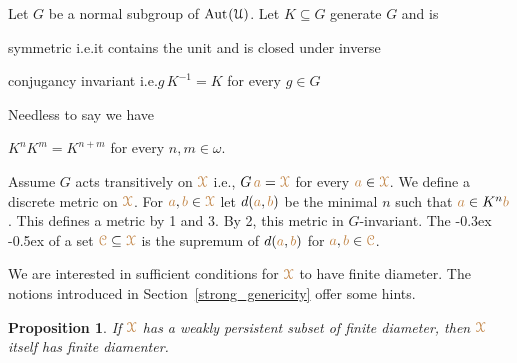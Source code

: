 \documentclass[10pt,openany]{amsproc}
\newcommand{\mylabel}[1]{{\ssf{#1}}\hfill}
\renewenvironment{itemize}
  {\begin{list}{}{%
   \setlength{\parskip}{0mm}
   \setlength{\topsep}{.2\baselineskip}
   \setlength{\rightmargin}{0mm}
   \setlength{\listparindent}{0mm}
   \setlength{\itemindent}{0mm}
   \setlength{\labelwidth}{2ex}
   \setlength{\itemsep}{.1\baselineskip}
   \setlength{\parsep}{0mm}
   \setlength{\partopsep}{0mm}
   \setlength{\labelsep}{1ex}
   \setlength{\leftmargin}{\labelwidth+\labelsep}
   \let\makelabel\mylabel
   }}
   {\vspace*{-.3\baselineskip}\end{list}}
\def\Aut{{\rm Aut\kern.15ex}}
\def\X{\EuScript X}
\def\C{\EuScript C}
\def\U{\EuScript U}
\def\ssf#1{\textsf{\small #1}}
\newcounter{thm}
\theoremstyle{mio}
\newtheorem{proposition}[thm]{Proposition}\tcolorboxenvironment{proposition}{mythm}
\def\mr{\color{brown}}
\def\mrC{{\mr\C}}
\def\mrX{{\mr\X}}
\renewcommand*{\emph}[1]{%
\kern-0.3ex
\smash{\tikz[baseline]\node[rectangle, fill=black!20!yellow!50!white, rounded corners, inner xsep=0.5ex, inner ysep=0.2ex, anchor=base, minimum height = 2.7ex]{#1};}\kern-0.5ex
}
\begin{document}
Let $G$ be a normal subgroup of $\Aut(\U)$.
Let $K\subseteq G$ generate $G$ and is
\begin{itemize}
  \item[1.] symmetric i.e.\@ it contains the unit and is closed under inverse
  \item[2.] conjugancy invariant i.e.\@ $g\,K^{-1}=K$ for every $g\in G$
\end{itemize}

Needless to say we have 

\begin{itemize}
  \item[3.] $K^nK^m=K^{n+m}$ for every $n,m\in\omega$.
\end{itemize}

Assume $G$ acts transitively on $\mrX$ i.e., $G\,{\mr a}=\mrX$ for every ${\mr a}\in\mrX$.
We define a discrete metric on $\mrX$.
For ${\mr a},{\mr b}\in\mrX$ let $d({\mr a},{\mr b})$ be the minimal $n$ such that ${\mr a}\in K^n{\mr b}$.
This defines a metric by \ssf1 and \ssf3.
By \ssf2, this metric in $G$-invariant.
The \emph{diameter\/} of a set $\mrC\subseteq\mrX$ is the supremum of $d({\mr a},{\mr b})$ for ${\mr a},{\mr b}\in\mrC$.

We are interested in sufficient conditions for $\mrX$ to have finite diameter.
The notions introduced in Section~\ref{strong_genericity} offer some hints.

\begin{proposition}\label{prop_wpers_finite_diameter}
  If $\mrX$ has a weakly persistent subset of finite diameter, then $\mrX$ itself has finite diamenter.
\end{proposition}
\end{document}
